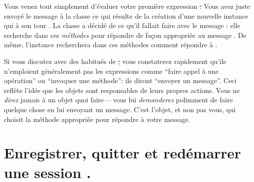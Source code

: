 \documentclass[a4paper,10pt,twoside]{book}
\begin{document}
Vous venez tout simplement d'évaluer votre première expression \st. 
Vous avez juste envoyé le message 
  à la classe \bam ce qui résulte de la création d'une
 nouvelle instance qui à son tour 
 . %
La classe \bam{} a décidé de ce qu'il fallait faire avec le message
: elle recherche dans ces \emph{méthodes} pour répondre de
façon appropriée au message 
.
De même, l'instance \bam recherchera dans ces méthodes comment
répondre à .

Si vous discutez avec des habitués de \st, vous constaterez rapidement
qu'ils n'emploient généralement pas les expressions comme ``faire appel
à une opération'' ou ``invoquer une méthode'': ils diront ``envoyer
un message''.
Ceci reflète l'idée que les objets sont responsables de leurs propres
actions.
Vous ne \emph{direz} jamais à un objet quoi faire\,---\,vous lui
\emph{demanderez} polimment de faire quelque chose en lui envoyant un
message.
C'est l'objet, et non pas vous, qui choisit la méthode appropriée pour
répondre à votre message.

\section{Enregistrer, quitter et redémarrer une session \pharo.}
\end{document}
